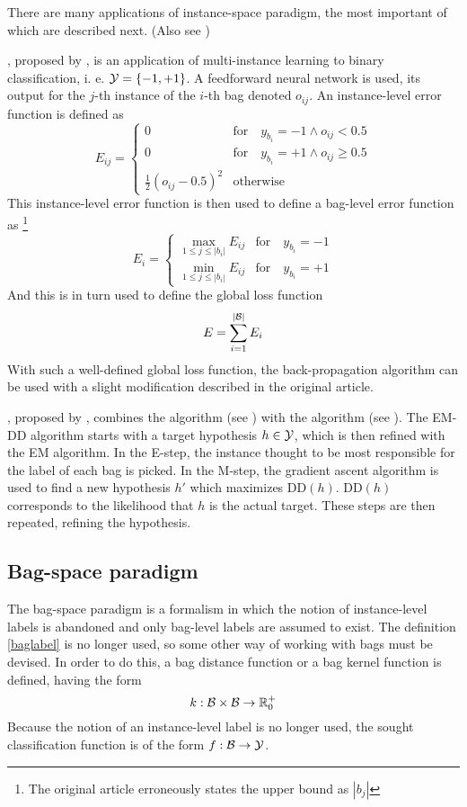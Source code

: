 There are many applications of instance-space paradigm, the most important of which are described next. (Also see \cite{andrews_support_2003} \cite{zhang_multiple_2006})

, proposed by \cite{zhou_neural_2002}, is an application of multi-instance learning to binary classification, i. e. \( \mathcal{Y} = \left\{ -1, +1 \right\} \). A feedforward neural network is used, its output for the \( j \)-th instance of the \( i \)-th bag denoted \( o_{ij} \). An instance-level error function is defined as
\[ E_{ij} = \begin{cases}
		0 &\text{for} \quad y_{b_i} = -1 \wedge o_{ij} < 0.5 \\
		0 &\text{for} \quad y_{b_i} = +1 \wedge o_{ij} \geq 0.5 \\
		\frac{1}{2} \left( o_{ij} - 0.5 \right)^2 &\text{otherwise}
	\end{cases} \]
This instance-level error function is then used to define a bag-level error function as \footnote{The original article erroneously states the upper bound as \( \left\lvert b_j \right\rvert \)}
\[ E_i = \begin{cases}
		\max_{1 \leq j \leq \left\lvert b_i \right\rvert} E_{ij} &\text{for} \quad y_{b_i} = -1 \\
		\min_{1 \leq j \leq \left\lvert b_i \right\rvert} E_{ij} &\text{for} \quad y_{b_i} = +1
	\end{cases} \]
And this is in turn used to define the global loss function
\[ E = \sum_{i = 1}^{\left\lvert \mathcal{B} \right\rvert} E_i \]
With such a well-defined global loss function, the back-propagation algorithm can be used with a slight modification described in the original article.

, proposed by \cite{zhang_em-dd:_2002}, combines the  algorithm (see \cite{dempster_maximum_1977}) with the  algorithm (see \cite{maron_framework_1998}). The EM-DD algorithm starts with a target hypothesis \( h \in \mathcal{Y} \), which is then refined with the EM algorithm. In the E-step, the instance thought to be most responsible for the label of each bag is picked. In the M-step, the gradient ascent algorithm is used to find a new hypothesis \( h' \) which maximizes \( \mathrm{DD} \left( h \right) \). \( \mathrm{DD} \left( h \right) \) corresponds to the likelihood that \( h \) is the actual target. These steps are then repeated, refining the hypothesis.

\subsection{Bag-space paradigm}\label{bag-space-paradigm}
The bag-space paradigm is a formalism in which the notion of instance-level labels is abandoned and only bag-level labels are assumed to exist. The definition \ref{baglabel} is no longer used, so some other way of working with bags must be devised. In order to do this, a bag distance function or a bag kernel function is defined, having the form
\[ k : \mathcal{B} \times \mathcal{B} \to \mathbb{R}_0^+ \]
Because the notion of an instance-level label is no longer used, the sought classification function is of the form \( f : \mathcal{B} \to \mathcal{Y} \).

